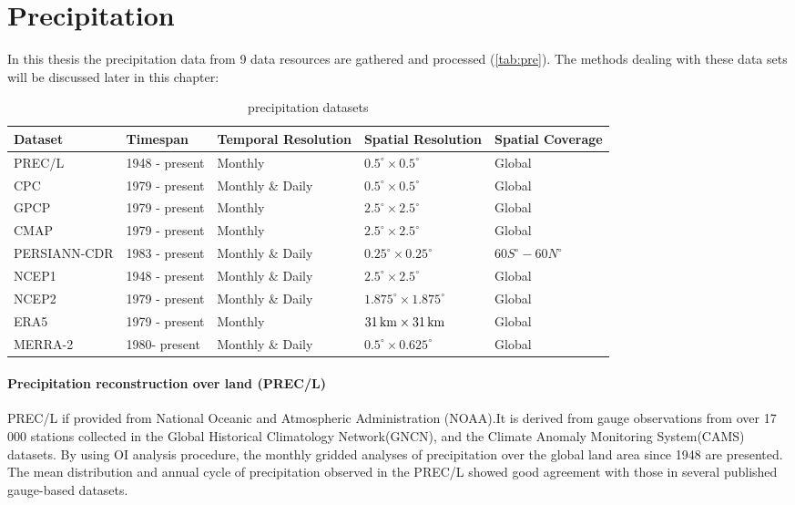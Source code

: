 \section{Precipitation}
In this thesis the precipitation data from 9 data resources are gathered and processed (\autoref{tab:pre}). The methods dealing with these data sets will be discussed later in this chapter:
\begin{table}[htbp]\centering 
	\begin{tabular}{|l|l|l|l|l|}
		\hline
		Dataset      & Timespan       & Temporal Resolution & Spatial Resolution & Spatial Coverage \\ \hline
		PREC/L       & 1948 - present & Monthly             & $0.5^{\circ} \times 0.5^{\circ}$          & Global           \\ \hline
		CPC          & 1979 - present & Monthly \& Daily    & $0.5^{\circ} \times 0.5^{\circ}$          & Global           \\ \hline
		GPCP         & 1979 - present & Monthly             & $2.5^{\circ} \times 2.5^{\circ}$          & Global           \\ \hline
		CMAP         & 1979 - present & Monthly             & $2.5^{\circ} \times 2.5^{\circ}$          & Global           \\ \hline
		PERSIANN-CDR & 1983 - present & Monthly \& Daily    & $0.25^{\circ} \times 0.25^{\circ}$        & $60S^{\circ} - 60N^{\circ}$      \\ \hline
		NCEP1        & 1948 - present & Monthly \& Daily    & $2.5^{\circ} \times 2.5^{\circ}$          & Global           \\ \hline
		NCEP2        & 1979 - present & Monthly \& Daily    & $1.875^{\circ} \times 1.875^{\circ}$      & Global           \\ \hline
		ERA5         & 1979 - present & Monthly             & $31\,\mathrm{km} \times 31\,\mathrm{km}$        & Global           \\ \hline
		MERRA-2      & 1980- present  & Monthly \& Daily    & $0.5^{\circ} \times 0.625^{\circ}$        & Global           \\ \hline
	\end{tabular}
	\caption{precipitation datasets}
	\label{tab:pre}
\end{table}
\paragraph{Precipitation reconstruction over land (PREC/L)}
PREC/L if provided from National Oceanic and Atmospheric Administration (NOAA).It is derived from gauge observations from over 17 000 stations collected in the Global Historical Climatology Network(GNCN), and the Climate Anomaly Monitoring System(CAMS) datasets. By using OI analysis procedure, the monthly gridded analyses of precipitation over the global land area since 1948 are presented. The mean distribution and annual cycle of precipitation observed in the PREC/L showed good agreement with those in several published gauge-based datasets. \cite{chen2002global}
